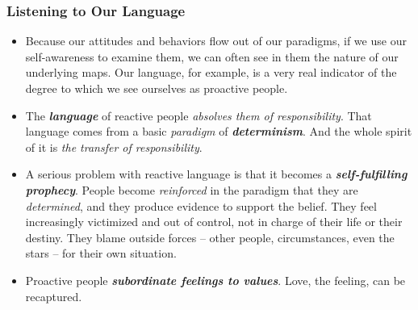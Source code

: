\documentclass[11pt]{article}
\begin{document}
\subsubsection{Listening to Our Language}
\begin{itemize}
\item Because our attitudes and behaviors flow out of our paradigms, if we use our self-awareness to examine them, we can often see in them the nature of our underlying maps. Our language, for example, is a very real indicator of the degree to which we see ourselves as proactive people.

\item The \emph{\textbf{language}} of reactive people \emph{absolves them of responsibility}. That language comes from a basic \emph{paradigm} of \emph{\textbf{determinism}}. And the whole spirit of it is \emph{the transfer of responsibility}.

\item A serious problem with reactive language is that it becomes a \emph{\textbf{self-fulfilling prophecy}}. People become \emph{reinforced} in the paradigm that they are \emph{determined}, and they produce evidence to support the belief. They feel increasingly victimized and out of control, not in charge of their life or their destiny.
They blame outside forces -- other people, circumstances, even the stars -- for their own situation.

\item Proactive people \emph{\textbf{subordinate feelings to values}}. Love, the feeling, can be recaptured.
\end{itemize}
\end{document}
